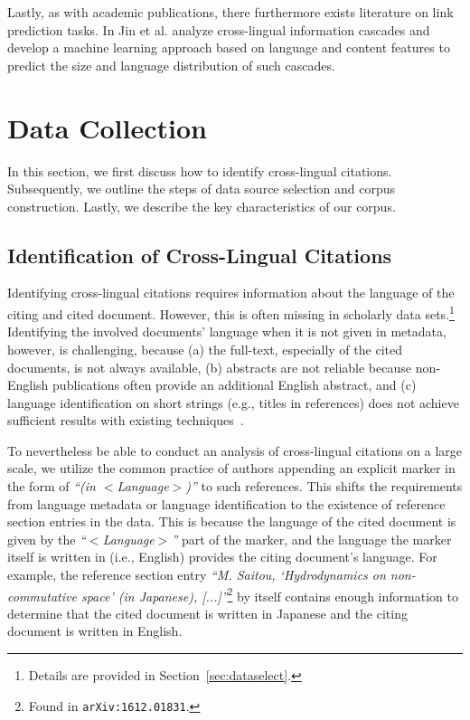 Lastly, as with academic publications, there furthermore exists literature on link prediction tasks. In \cite{Jin2017} Jin et al. analyze cross-lingual information cascades and develop a machine learning approach based on language and content features to predict the size and language distribution of such cascades.

\section{Data Collection}\label{sec:datacollection}

In this section, we first discuss how to identify cross-lingual citations. Subsequently, we outline the steps of data source selection and corpus construction. Lastly, we describe the key characteristics of our corpus.

\subsection{Identification of Cross-Lingual Citations}
\label{sec:ident}
Identifying cross-lingual citations requires information about the language of the citing and cited document. However, this is often missing in scholarly data sets.\footnote{Details are provided in Section~\ref{sec:dataselect}.} Identifying the involved documents' language when it is not given in metadata, however, is challenging, because (a) the full-text, especially of the cited documents, is not always available, (b) abstracts are not reliable because non-English publications often provide an additional English abstract, and (c) language identification on short strings (e.g., titles in references) does not achieve sufficient results with existing techniques~\cite{Jauhiainen2019}.

To nevertheless be able to conduct an analysis of cross-lingual citations on a large scale, we utilize the common practice of authors appending an explicit marker in the form of \textit{``(in $<$Language$>$)''} to such references. This shifts the requirements from language metadata or language identification to the existence of reference section entries in the data. This is because the language of the cited document is given by the \textit{``$<$Language$>$''} part of the marker, and the language the marker itself is written in (i.e., English) provides the citing document's language. For example, the reference section entry \textit{``M. Saitou, `Hydrodynamics on non-commutative space' (in Japanese), [...]''}\footnote{Found in \texttt{arXiv:1612.01831}.} by itself contains enough information to determine that the cited document is written in Japanese and the citing document is written in English.

